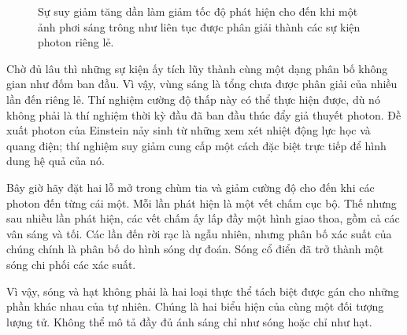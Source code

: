 \begin{figure}[h]
\centering
{}
\caption{Sự suy giảm tăng dần làm giảm tốc độ phát hiện cho đến khi một ảnh phơi sáng trông như liên tục được phân giải thành các sự kiện photon riêng lẻ.}
\end{figure}

Chờ đủ lâu thì những sự kiện ấy tích lũy thành cùng một dạng phân bố không gian như đốm ban đầu. Vì vậy, vùng sáng là tổng chưa được phân giải của nhiều lần đến riêng lẻ. Thí nghiệm cường độ thấp này có thể thực hiện được, dù nó không phải là thí nghiệm thời kỳ đầu đã ban đầu thúc đẩy giả thuyết photon. Đề xuất photon của Einstein nảy sinh từ những xem xét nhiệt động lực học và quang điện; thí nghiệm suy giảm cung cấp một cách đặc biệt trực tiếp để hình dung hệ quả của nó.

Bây giờ hãy đặt hai lỗ mở trong chùm tia và giảm cường độ cho đến khi các photon đến từng cái một. Mỗi lần phát hiện là một vết chấm cục bộ. Thế nhưng sau nhiều lần phát hiện, các vết chấm ấy lấp đầy một hình giao thoa, gồm cả các vân sáng và tối. Các lần đến rời rạc là ngẫu nhiên, nhưng phân bố xác suất của chúng chính là phân bố do hình sóng dự đoán. Sóng cổ điển đã trở thành một sóng chi phối các xác suất.

Vì vậy, sóng và hạt không phải là hai loại thực thể tách biệt được gán cho những phần khác nhau của tự nhiên. Chúng là hai biểu hiện của cùng một đối tượng lượng tử. Không thể mô tả đầy đủ ánh sáng chỉ như sóng hoặc chỉ như hạt.

